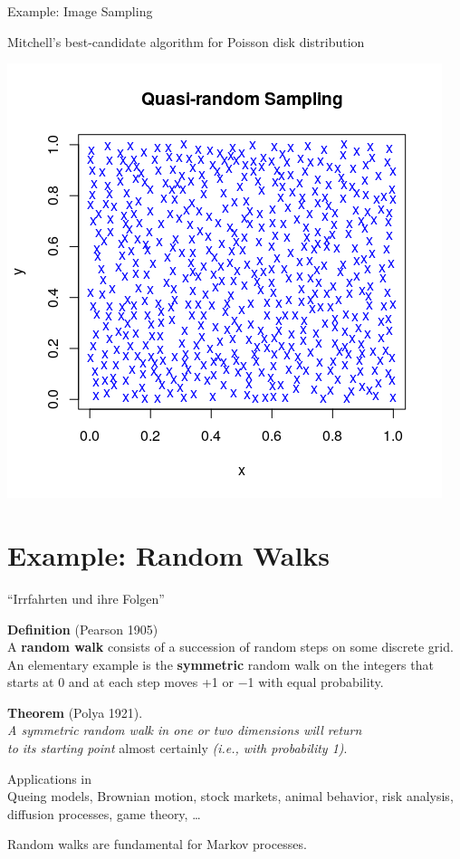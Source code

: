 \documentclass[ignorenonframetext,]{beamer}
\begin{document}
\begin{frame}{Example: Image Sampling}
\protect\hypertarget{example-image-sampling}{}

Mitchell's best-candidate algorithm for Poisson disk distribution

\includegraphics{quasirandom.png}

\end{frame}

\hypertarget{example-random-walks}{%
\section{Example: Random Walks}\label{example-random-walks}}

\begin{frame}{``Irrfahrten und ihre Folgen''}
\protect\hypertarget{irrfahrten-und-ihre-folgen}{}

\textbf{Definition} (Pearson 1905)\\
A \textbf{random walk} consists of a succession of random steps on some
discrete grid. An elementary example is the \textbf{symmetric} random
walk on the integers that starts at 0 and at each step moves +1 or −1
with equal probability.

\textbf{Theorem} (Polya 1921).\\
\emph{A symmetric random walk in one or two dimensions will return\\
to its starting point} almost certainly \emph{(i.e., with probability
1)}.

Applications in\\
Queing models, Brownian motion, stock markets, animal behavior, risk
analysis, diffusion processes, game theory, \ldots{}

Random walks are fundamental for Markov processes.

\end{frame}
\end{document}
